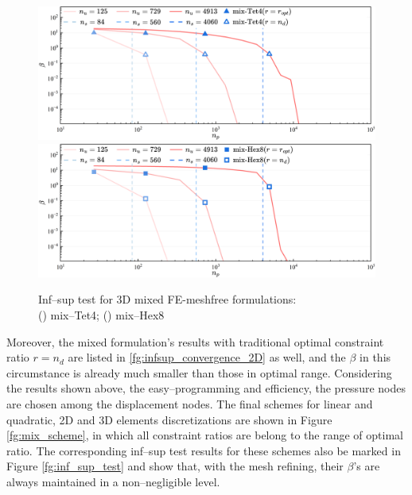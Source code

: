 \begin{figure}[H]
\centering
\begin{subcaptiongroup}
\includegraphics[width=\textwidth]{png/Tet4.png}\label{infsup_convergence_3D_a}
\includegraphics[width=\textwidth]{png/Hex8.png}\label{infsup_convergence_3D_b}
\end{subcaptiongroup}
\captionsetup{aboveskip=0pt}
\caption{\centering Inf--sup test for 3D mixed FE-meshfree formulations: \\ () mix--Tet4; () mix--Hex8}
\label{fg:infsup_convergence_3D}
\end{figure}
Moreover, the mixed formulation's results with traditional optimal constraint ratio $r=n_d$ are listed in \ref{fg:infsup_convergence_2D} as well,
and the $\beta$ in this circumstance is already much smaller than those in optimal range.
Considering the results shown above, the easy--programming and efficiency,
the pressure nodes are chosen among the displacement nodes.
The final schemes for linear and quadratic, 2D and 3D elements discretizations are shown in Figure \ref{fg:mix_scheme},
in which all constraint ratios are belong to the range of optimal ratio.
The corresponding inf--sup test results for these schemes also be marked in Figure \ref{fg:inf_sup_test} and show that,
with the mesh refining, their $\beta$'s are always maintained in a non--negligible level.

